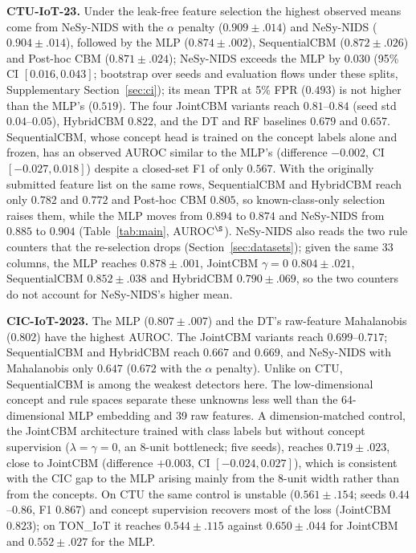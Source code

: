 \documentclass[journal]{IEEEtran}
\begin{document}
\textbf{CTU-IoT-23.} Under the leak-free feature selection the highest observed means come from NeSy-NIDS with the $\alpha$ penalty ($0.909{\pm}.014$) and NeSy-NIDS ($0.904{\pm}.014$), followed by the MLP ($0.874{\pm}.002$), SequentialCBM ($0.872{\pm}.026$) and Post-hoc CBM ($0.871{\pm}.024$); NeSy-NIDS exceeds the MLP by $0.030$ (95\% CI $[0.016, 0.043]$; bootstrap over seeds and evaluation flows under these splits, Supplementary Section~\ref{sec:ci}); its mean TPR at 5\% FPR ($0.493$) is not higher than the MLP's ($0.519$). The four JointCBM variants reach $0.81$--$0.84$ (seed std $0.04$--$0.05$), HybridCBM $0.822$, and the DT and RF baselines $0.679$ and $0.657$. SequentialCBM, whose concept head is trained on the concept labels alone and frozen, has an observed AUROC similar to the MLP's (difference $-0.002$, CI $[-0.027, 0.018]$) despite a closed-set F1 of only $0.567$. With the originally submitted feature list on the same rows, SequentialCBM and HybridCBM reach only $0.782$ and $0.772$ and Post-hoc CBM $0.805$, so known-class-only selection raises them, while the MLP moves from $0.894$ to $0.874$ and NeSy-NIDS from $0.885$ to $0.904$ (Table~\ref{tab:main}, AUROC$^\S$). NeSy-NIDS also reads the two rule counters that the re-selection drops (Section~\ref{sec:datasets}); given the same 33 columns, the MLP reaches $0.878{\pm}.001$, JointCBM $\gamma{=}0$ $0.804{\pm}.021$, SequentialCBM $0.852{\pm}.038$ and HybridCBM $0.790{\pm}.069$, so the two counters do not account for NeSy-NIDS's higher mean.

\textbf{CIC-IoT-2023.} The MLP ($0.807{\pm}.007$) and the DT's raw-feature Mahalanobis ($0.802$) have the highest AUROC. The JointCBM variants reach $0.699$--$0.717$; SequentialCBM and HybridCBM reach $0.667$ and $0.669$, and NeSy-NIDS with Mahalanobis only $0.647$ ($0.672$ with the $\alpha$ penalty). Unlike on CTU, SequentialCBM is among the weakest detectors here. The low-dimensional concept and rule spaces separate these unknowns less well than the 64-dimensional MLP embedding and 39 raw features. A dimension-matched control, the JointCBM architecture trained with class labels but without concept supervision ($\lambda{=}\gamma{=}0$, an 8-unit bottleneck; five seeds), reaches $0.719{\pm}.023$, close to JointCBM (difference $+0.003$, CI $[-0.024, 0.027]$), which is consistent with the CIC gap to the MLP arising mainly from the 8-unit width rather than from the concepts. On CTU the same control is unstable ($0.561{\pm}.154$; seeds $0.44$--$0.86$, F1 $0.867$) and concept supervision recovers most of the loss (JointCBM $0.823$); on TON\_IoT it reaches $0.544{\pm}.115$ against $0.650{\pm}.044$ for JointCBM and $0.552{\pm}.027$ for the MLP.
\end{document}
